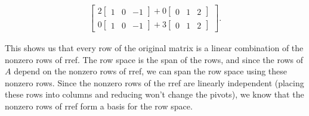 \begin{example}
\begin{align*}
\begin{bmatrix}
2\begin{bmatrix}1&0&-1\end{bmatrix} + 0 \begin{bmatrix}0&1&2\end{bmatrix}\\
0\begin{bmatrix}1&0&-1\end{bmatrix} + 3 \begin{bmatrix}0&1&2\end{bmatrix}
\end{bmatrix}
.
\end{align*}

This shows us that every row of the original matrix is a linear combination of the nonzero rows of rref. The row space is the span of the rows, and since the rows of $A$ depend on the nonzero rows of rref, we can span the row space using these nonzero rows. Since the nonzero rows of the rref are linearly independent (placing these rows into columns and reducing won't change the pivots), we know that the nonzero rows of rref form a basis for the row space.  
\marginpar{
}
\end{example}
